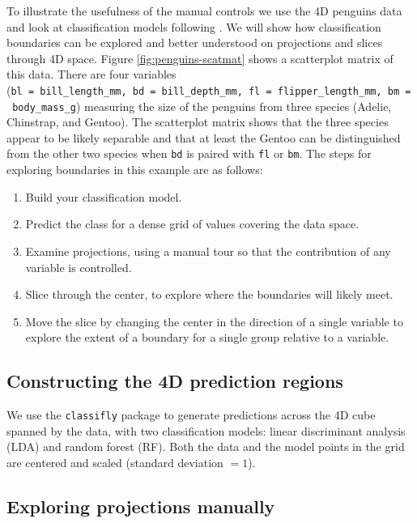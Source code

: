 \documentclass[]{interact}
\theoremstyle{plain}%
\theoremstyle{definition}
\theoremstyle{remark}
\providecommand{\tightlist}{%
  \setlength{\itemsep}{0pt}\setlength{\parskip}{0pt}}
\def\tightlist{}
\begin{document}
To illustrate the usefulness of the manual controls we use the 4D
penguins data \citep{penguins} and look at classification models
following \citet{sam11271}. We will show how classification boundaries
can be explored and better understood on projections and slices through
4D space. Figure \ref{fig:penguins-scatmat} shows a scatterplot matrix
of this data. There are four variables
(\texttt{bl\ =\ bill\_length\_mm,\ bd\ =\ bill\_depth\_mm,\ fl\ =\ flipper\_length\_mm,\ bm\ =\ body\_mass\_g})
measuring the size of the penguins from three species (Adelie,
Chinstrap, and Gentoo). The scatterplot matrix shows that the three
species appear to be likely separable and that at least the Gentoo can
be distinguished from the other two species when \texttt{bd} is paired
with \texttt{fl} or \texttt{bm}. The steps for exploring boundaries in
this example are as follows:

\begin{enumerate}
\def\labelenumi{\arabic{enumi}.}
\tightlist
\item
  Build your classification model.
\item
  Predict the class for a dense grid of values covering the data space.
\item
  Examine projections, using a manual tour so that the contribution of
  any variable is controlled.
\item
  Slice through the center, to explore where the boundaries will likely
  meet.
\item
  Move the slice by changing the center in the direction of a single
  variable to explore the extent of a boundary for a single group
  relative to a variable.
\end{enumerate}

\hypertarget{constructing-the-4d-prediction-regions}{%
\subsection{Constructing the 4D prediction
regions}\label{constructing-the-4d-prediction-regions}}

We use the \texttt{classifly} package \citep{classifly} to generate
predictions across the 4D cube spanned by the data, with two
classification models: linear discriminant analysis (LDA) and random
forest (RF). Both the data and the model points in the grid are centered
and scaled (standard deviation \(= 1\)).

\hypertarget{exploring-projections-manually}{%
\subsection{Exploring projections
manually}\label{exploring-projections-manually}}
\end{document}
